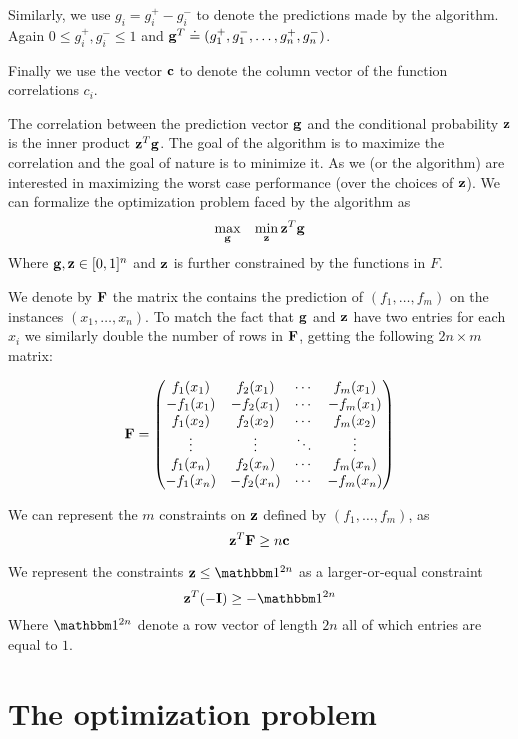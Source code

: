 \documentclass{article}[12pt]
\begin{document}
Similarly, we use $g_i =g_i^+ - g_i^-$ to denote the predictions made
by the algorithm. Again $0 \leq g_i^+,g_i^- \leq 1$ and 
$\mathbf{g}^T \doteq (g_1^+,g_1^-,\ldots, g_n^+,g_n^-)$.

Finally we use the vector $\mathbf{c}$ to denote the column vector of the
function correlations $c_i$.

The correlation between the prediction vector $\mathbf{g}$ and the
conditional probability $\mathbf{z}$ is the inner product $\mathbf{z}^T \mathbf{g}$. The
goal of the algorithm is to maximize the correlation and the goal of
nature is to minimize it. As we (or the algorithm) are interested in
maximizing the worst case performance (over the choices of $\mathbf{z}$). We
can formalize the optimization problem faced by the algorithm as
\[
\max_{\mathbf{g}}\;\;\; \min_{\mathbf{z}} \mathbf{z}^T \mathbf{g}
\]
Where $\mathbf{g},\mathbf{z} \in [0,1]^n$ and $\mathbf{z}$ is further constrained by the
functions in $F$.

We denote by $\mathbf{F}$ the matrix the contains the prediction of
$(f_1,\ldots,f_m)$ on the instances $(x_1,\ldots,x_n)$. To match the
fact that $\mathbf{g}$ and $\mathbf{z}$ have two entries for each $x_i$ we similarly
double the number of rows in $\mathbf{F}$, getting the following $2n \times
m$ matrix:

\begin{equation}
\mathbf{F} = 
 \begin{pmatrix}
   f_1(x_1) &  f_2(x_1) & \cdots &  f_m(x_1) \\
  -f_1(x_1) & -f_2(x_1) & \cdots & -f_m(x_1) \\
   f_1(x_2) &  f_2(x_2) & \cdots &  f_m(x_2) \\
   \vdots   & \vdots    & \ddots &  \vdots  \\
   f_1(x_n)  &  f_2(x_n)  & \cdots &   f_m(x_n) \\
  -f_1(x_n)  & -f_2(x_n)  & \cdots &  -f_m(x_n) 
 \end{pmatrix}
\end{equation}

We can represent the $m$ constraints on $\mathbf{z}$ defined by
$(f_1,\ldots,f_m)$, as
\[
\mathbf{z}^T \mathbf{F} \geq n \mathbf{c}
\]

We represent the constraints $\vz \leq \ones{2n}$ as a larger-or-equal
constraint
\[
\vz^T (-\vI) \geq -\ones{2n}
\] 
Where $\ones{2n}$ denote a row vector of length $2n$ all of which
entries are equal to $1$.

\newpage

\section{The optimization problem}
\end{document}
